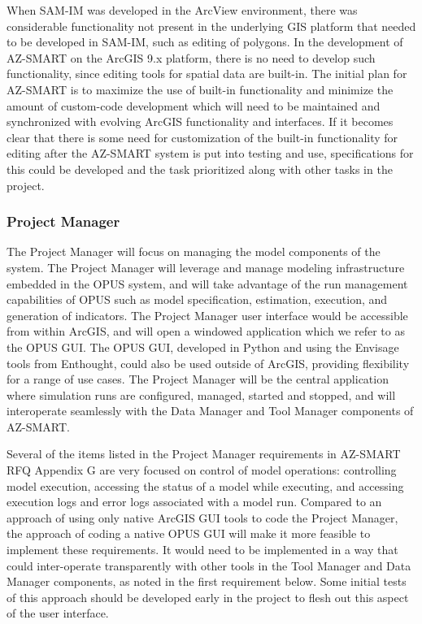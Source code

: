When SAM-IM was developed in the ArcView environment, there was
considerable functionality not present in the underlying GIS
platform that needed to be developed in SAM-IM, such as editing of
polygons.  In the development of AZ-SMART on the ArcGIS 9.x
platform, there is no need to develop such functionality, since
editing tools for spatial data are built-in.  The initial plan for
AZ-SMART is to maximize the use of built-in functionality and
minimize the amount of custom-code development which will need to be
maintained and synchronized with evolving ArcGIS functionality and
interfaces.  If it becomes clear that there is some need for
customization of the built-in functionality for editing after the
AZ-SMART system is put into testing and use, specifications for this
could be developed and the task prioritized along with other tasks
in the project.


\subsubsection{Project Manager}

The Project Manager will focus on managing the model components of the
system. The Project Manager will leverage and manage modeling infrastructure
embedded in the OPUS system, and will take advantage of the run management
capabilities of OPUS such as model specification, estimation, execution, and
generation of indicators.  The Project Manager user interface would be
accessible from within ArcGIS, and will open a windowed application which
we refer to as the OPUS GUI.  The OPUS GUI, developed in Python and using
the Envisage tools from Enthought, could also be used outside of ArcGIS,
providing flexibility for a range of use cases.  The Project Manager will
be the central application where simulation runs are configured, managed,
started and stopped, and will interoperate seamlessly with the Data Manager
and Tool Manager components of AZ-SMART.

Several of the items listed in the Project Manager requirements in AZ-SMART
RFQ Appendix G are very focused on control of model operations: controlling
model execution, accessing the status of a model while executing, and
accessing execution logs and error logs associated with a model run.
Compared to an approach of using only native ArcGIS GUI tools to code
the Project Manager, the approach of coding a native OPUS GUI will make
it more feasible to implement these requirements.  It would need to be
implemented in a way that could inter-operate transparently with other
tools in the Tool Manager and Data Manager components, as noted in the
first requirement below. Some initial tests of this approach should be
developed early in the project to flesh out this aspect of the user
interface.
